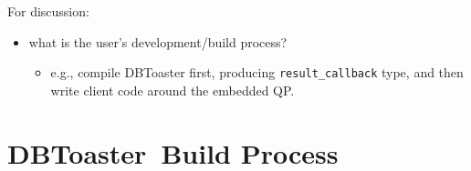\documentclass{article}
\newcommand{\compiler}{DBToaster}
\begin{document}
For discussion:
\begin{itemize}
\item what is the user's development/build process?
  \begin{itemize}
  \item e.g., compile DBToaster first, producing \texttt{result\_callback} type,
		and then write client code around the embedded QP.
  \end{itemize}
\end{itemize}

\section{\compiler\ Build Process}
\end{document}
